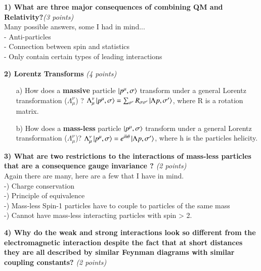 {\large



\textbf{1) What are three major consequences of combining QM and Relativity?}\hfill \textit{(3 points)}\\

Many possible answers, some I had in mind...\\
- Anti-particles\\
- Connection between spin and statistics\\
- Only contain certain types of leading interactions


\vspace{0.5in}


\textbf{2) Lorentz Transforms } \hfill \textit{(4 points)}\\
\begin{itemize}
\item[a)] How does a \textbf{massive} particle $\ket{p^\mu,\sigma}$ transform under a general Lorentz transformation ($\Lambda_\mu^\nu$) ?
$\Lambda_\mu^\nu \ket{p^\mu,\sigma} = \sum_{\sigma'} R_{\sigma \sigma'} \ket{\Lambda p,\sigma'}$, where R is a rotation matrix.
\item[b)] How does a \textbf{mass-less} particle $\ket{p^\mu,\sigma}$ transform under a general Lorentz transformation ($\Lambda_\mu^\nu$)?
$\Lambda_\mu^\nu \ket{p^\mu,\sigma} = e^{ih\theta} \ket{\Lambda p,\sigma'}$, where h is the particles helicity.
\end{itemize}



\textbf{3) What are two restrictions to the interactions of mass-less particles that are a consequence gauge invariance ? }\hfill \textit{(2 points)}\\

Again there are many, here are a few that I have in mind.\\
-) Charge conservation\\
-) Principle of equivalence\\
-) Mass-less Spin-1 particles have to couple to particles of the same mass\\
-) Cannot have mass-less interacting particles with spin > 2.



\textbf{4) Why do the weak and strong interactions look so different from the electromagnetic interaction despite the fact that at short distances they are all described by similar Feynman diagrams with similar coupling constants?} \hfill \textit{(2 points)}\\

}
